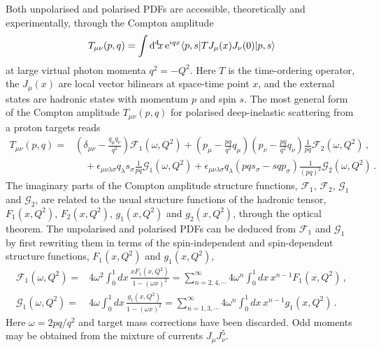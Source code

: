 Both unpolarised and polarised PDFs are accessible, theoretically and experimentally, through the Compton amplitude
\begin{equation}
T_{\mu\nu}(p,q) = \int {\rm d}^4\!x\, {\rm e}^{iqx}  \langle p,s |T J_\mu(x) J_\nu(0)|p,s\rangle   
\end{equation}
at large virtual photon momenta $q^2=-Q^2$. Here $T$ is the time-ordering operator, the $J_\mu(x)$ are local vector bilinears at space-time point $x$, and the external states are hadronic states with momentum $p$ and spin $s$. The most general form of the Compton amplitude $T_{\mu\nu}(p,q)$ for polarised deep-inelastic scattering from a proton targets reads
\begin{align}
T_{\mu\nu}(p,q) = {} & \left(\delta_{\mu\nu}-\frac{q_\mu q_\nu}{q^2}\right) \mathcal{F}_1(\omega,Q^2) + \left(p_\mu-\frac{pq}{q^2}q_\mu\right) \left(p_\nu-\frac{pq}{q^2}q_\nu\right) \frac{1}{pq} \mathcal{F}_2(\omega,Q^2)\,,\\ 
& {} \quad  + \epsilon_{\mu\nu\lambda\sigma}q_\lambda s_\sigma \frac{1}{pq}\mathcal{G}_1(\omega,Q^2) + \epsilon_{\mu\nu\lambda\sigma}q_\lambda \left(pq s_\sigma - sq p_\sigma\right) \frac{1}{(pq)^2}\mathcal{G}_2(\omega,Q^2)\,.
\end{align}
The imaginary parts of the Compton amplitude structure functions, $\mathcal{F}_1$, $\mathcal{F}_2$, $\mathcal{G}_1$ and $\mathcal{G}_2$, are related to the usual structure functions of the hadronic tensor, $F_1(x,Q^2)$, $F_2(x,Q^2)$, $g_1(x,Q^2)$ and $g_2(x,Q^2)$, through the optical theorem. The unpolarised and polarised PDFs can be deduced from $\mathcal{F}_1$ and $\mathcal{G}_1$ by first rewriting them in terms of the spin-independent and spin-dependent structure functions, $F_1(x,Q^2)$ and $g_1(x,Q^2)$,
\begin{align}
\mathcal{F}_1(\omega,Q^2) = {} & 4 \omega^2 \int_0^1 dx\,  \frac{xF_1(x,Q^2)}{1-(\omega x)^2} = \sum_{n=2,4,\cdots}^\infty 4\omega^n \int_0^1 dx\, x^{n-1} F_1(x,Q^2) \,, \\
\mathcal{G}_1(\omega,Q^2) = {} & 4 \omega \int_0^1 dx\, \frac{g_1(x,Q^2)}{1-(\omega x)^2} = \sum_{n=1,3,\cdots}^\infty 4\omega^n \int_0^1 dx\, x^{n-1} g_1(x,Q^2)\,.
\end{align}
Here $\omega=2pq/q^2$ and target mass corrections have been discarded. Odd moments may be obtained from the mixture of currents $J_\mu J_\nu^5$.

